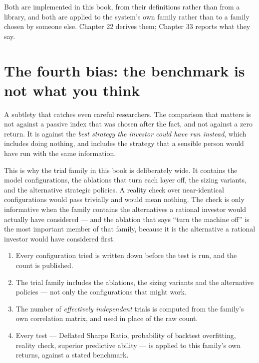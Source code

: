 Both are implemented in this book, from their definitions rather than from
a library, and both are applied to the system's own family rather than to a
family chosen by someone else. Chapter 22 derives them; Chapter 33 reports
what they say.

\section{The fourth bias: the benchmark is not what you think}

A subtlety that catches even careful researchers. The comparison that
matters is not against a passive index that was chosen after the fact, and
not against a zero return. It is against the \emph{best strategy the investor
could have run instead}, which includes doing nothing, and includes the
strategy that a sensible person would have run with the same information.

This is why the trial family in this book is deliberately wide. It contains
the model configurations, the ablations that turn each layer off, the
sizing variants, and the alternative strategic policies. A reality check
over near-identical configurations would pass trivially and would mean
nothing. The check is only informative when the family contains the
alternatives a rational investor would actually have considered --- and the
ablation that says ``turn the machine off'' is the most important member
of that family, because it is the alternative a rational investor would
have considered first.

\begin{takeaway}
\begin{enumerate}
\item Every configuration tried is written down before the test is run, and
the count is published.
\item The trial family includes the ablations, the sizing variants and the
alternative policies --- not only the configurations that might work.
\item The number of \emph{effectively independent} trials is computed from
the family's own correlation matrix, and used in place of the raw count.
\item Every test --- Deflated Sharpe Ratio, probability of backtest
overfitting, reality check, superior predictive ability --- is applied to
this family's own returns, against a stated benchmark.
\end{enumerate}
\end{takeaway}


